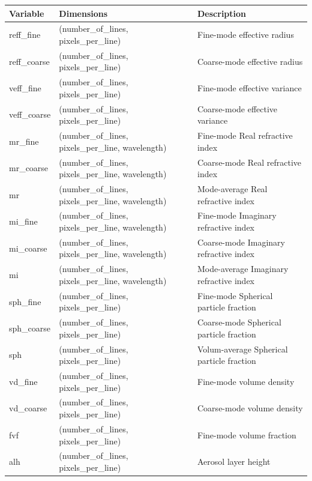\documentclass[
  letterpaper,
  open=any]{scrbook}
\begin{document}
\begin{longtable}[]{@{}
  >{\raggedright\arraybackslash}p{}
  >{\raggedright\arraybackslash}p{}
  >{\raggedright\arraybackslash}p{}@{}}
\toprule\noalign{}
\begin{minipage}[b]{\linewidth}\raggedright
Variable
\end{minipage} & \begin{minipage}[b]{\linewidth}\raggedright
Dimensions
\end{minipage} & \begin{minipage}[b]{\linewidth}\raggedright
Description
\end{minipage} \\
\midrule\noalign{}
\endhead
\bottomrule\noalign{}
\endlastfoot
reff\_fine & (number\_of\_lines, pixels\_per\_line) & Fine-mode
effective radius \\
reff\_coarse & (number\_of\_lines, pixels\_per\_line) & Coarse-mode
effective radius \\
veff\_fine & (number\_of\_lines, pixels\_per\_line) & Fine-mode
effective variance \\
veff\_coarse & (number\_of\_lines, pixels\_per\_line) & Coarse-mode
effective variance \\
mr\_fine & (number\_of\_lines, pixels\_per\_line, wavelength) &
Fine-mode Real refractive index \\
mr\_coarse & (number\_of\_lines, pixels\_per\_line, wavelength) &
Coarse-mode Real refractive index \\
mr & (number\_of\_lines, pixels\_per\_line, wavelength) & Mode-average
Real refractive index \\
mi\_fine & (number\_of\_lines, pixels\_per\_line, wavelength) &
Fine-mode Imaginary refractive index \\
mi\_coarse & (number\_of\_lines, pixels\_per\_line, wavelength) &
Coarse-mode Imaginary refractive index \\
mi & (number\_of\_lines, pixels\_per\_line, wavelength) & Mode-average
Imaginary refractive index \\
sph\_fine & (number\_of\_lines, pixels\_per\_line) & Fine-mode Spherical
particle fraction \\
sph\_coarse & (number\_of\_lines, pixels\_per\_line) & Coarse-mode
Spherical particle fraction \\
sph & (number\_of\_lines, pixels\_per\_line) & Volum-average Spherical
particle fraction \\
vd\_fine & (number\_of\_lines, pixels\_per\_line) & Fine-mode volume
density \\
vd\_coarse & (number\_of\_lines, pixels\_per\_line) & Coarse-mode volume
density \\
fvf & (number\_of\_lines, pixels\_per\_line) & Fine-mode volume
fraction \\
alh & (number\_of\_lines, pixels\_per\_line) & Aerosol layer height \\
\end{longtable}
\end{document}

